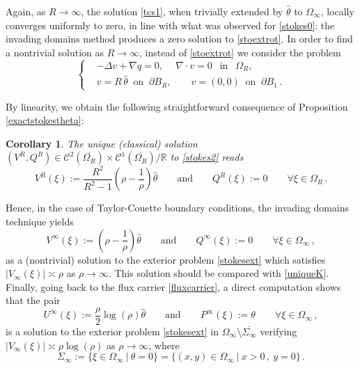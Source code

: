 \documentclass[a4paper,11pt]{article}
\newtheorem{corollary}[theorem]{Corollary}
\numberwithin{equation}{section}
\numberwithin{figure}{section}
\begin{document}
Again, as $R \to \infty$, the solution \eqref{tcs1}, when trivially extended by $\widehat{\theta}$ to $\Omega_{\infty}$, locally converges
uniformly to zero, in line with what was observed for \eqref{stokes0}: the invading domains method produces a zero solution to
\eqref{stoextrot}.
In order to find a nontrivial solution as $R\to\infty$, instead of \eqref{stoextrot} we consider the problem
\begin{equation}\label{stokes2}
\left\{
\begin{aligned}
	& -\Delta v+\nabla q=0,\ \quad  \nabla\cdot v=0 \ \ \mbox{ in } \ \ \Omega_{R}, \\[3pt]
	& v = R\, \widehat{\theta} \ \text{ on } \ \partial B_R, \qquad v = (0,0) \ \text{ on } \ \partial B_{1} \, .
\end{aligned}
\right.
\end{equation}

By linearity, we obtain the following straightforward consequence of Proposition \ref{exactstokestheta}:

\begin{corollary}\label{outerstokes2}
The unique (classical) solution $(V^R,Q^R)\in\mathcal{C}^{2}(\overline{\Omega_{R}}) \times \mathcal{C}^{1}(\overline{\Omega_{R}})/\mathbb{R}$ to \eqref{stokes2} reads
$$
V^R(\xi) := \dfrac{R^2}{R^2-1}\left(\rho-\dfrac{1}{\rho}\right)\widehat{\theta}\qquad\text{and}\qquad
Q^R(\xi) := 0\qquad\forall\xi\in\Omega_{R} \, .
$$
\end{corollary}

Hence, in the case of Taylor-Couette boundary conditions, the invading domains technique yields
$$
V^\infty(\xi) := \left( \rho - \dfrac{1}{\rho} \right) \widehat{\theta} \qquad \text{and} \qquad Q^\infty(\xi) := 0 \qquad \forall \xi \in
\Omega_\infty\, ,
$$
as a (nontrivial) solution to the exterior problem \eqref{stokesext} which satisfies $|V_\infty(\xi)|\asymp\rho$
as $\rho\to\infty$. This solution should be compared with \eqref{uniqueK}. Finally, going back to the flux carrier \eqref{fluxcarrier}, a direct computation shows that the pair
$$
U^\infty(\xi) := \dfrac{\rho}{2} \log(\rho) \widehat{\theta} \qquad \text{and} \qquad P^\infty(\xi) := \theta \qquad \forall \xi \in
\Omega_\infty\, ,
$$
is a solution to the exterior problem \eqref{stokesext} in $\Omega_{\infty} \setminus \overline{\Sigma_{\infty}}$ verifying $|V_\infty(\xi)|\asymp \rho \log(\rho)$ as $\rho\to\infty$,
where
$$
\Sigma_{\infty} := \{ \xi \in \Omega_{\infty} \ | \ \theta = 0 \} = \{ (x,y) \in \Omega_{\infty} \ | \ x > 0 \, , \ y=0\} \, .
$$
\end{document}
